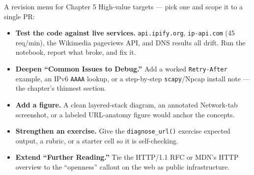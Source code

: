 \documentclass[9pt,aspectratio=169]{beamer}
\begin{document}
\begin{frame}{A revision menu for Chapter 5}
    High-value targets --- pick one and scope it to a single PR:
    \begin{itemize}
        \item \textbf{Test the code against live services.} \texttt{api.ipify.org}, \texttt{ip-api.com} (45 req/min), the Wikimedia pageviews API, and DNS results all drift. Run the notebook, report what broke, and fix it.
        \item \textbf{Deepen ``Common Issues to Debug.''} Add a worked \texttt{Retry-After} example, an IPv6 \texttt{AAAA} lookup, or a step-by-step \texttt{scapy}/Npcap install note --- the chapter's thinnest section.
        \item \textbf{Add a figure.} A clean layered-stack diagram, an annotated Network-tab screenshot, or a labeled URL-anatomy figure would anchor the concepts.
        \item \textbf{Strengthen an exercise.} Give the \texttt{diagnose\_url()} exercise expected output, a rubric, or a starter cell so it is self-checking.
        \item \textbf{Extend ``Further Reading.''} Tie the HTTP/1.1 RFC or MDN's HTTP overview to the ``openness'' callout on the web as public infrastructure.
    \end{itemize}
\end{frame}
\end{document}
